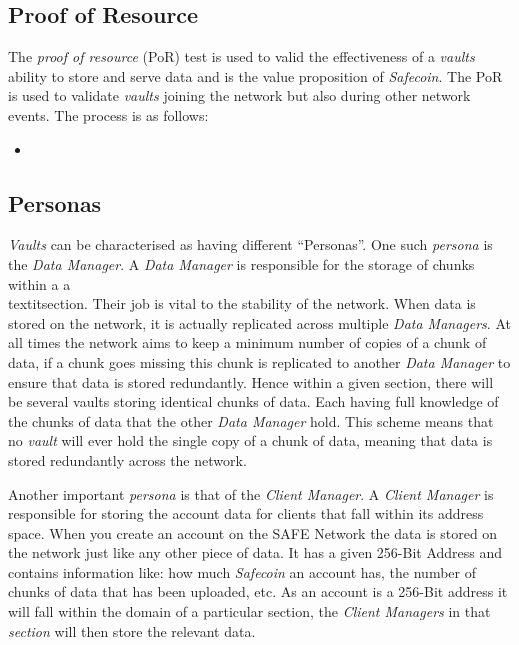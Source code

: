 \subsection{Proof of Resource}
\label{subsec:proof-of-resource}

The \textit{proof of resource} (PoR) test is used to valid the effectiveness of a \textit{vaults} ability to store and serve data and is the value proposition of \textit{Safecoin}. The PoR is used to validate \textit{vaults} joining the network but also during other network events. The process is as follows:

\begin{itemize}
	\item 
\end{itemize}

\subsection{Personas}

\textit{Vaults} can be characterised as having different ``Personas''. One such \textit{persona} is the \textit{Data Manager}. A \textit{Data Manager} is responsible for the storage of chunks within a a\\textit{section}. Their job is vital to the stability of the network. When data is stored on the network, it is actually replicated across multiple \textit{Data Managers}. At all times the network aims to keep a minimum number of copies of a chunk of data, if a chunk goes missing this chunk is replicated to another \textit{Data Manager} to ensure that data is stored redundantly. Hence within a given section, there will be several vaults storing identical chunks of data. Each having full knowledge of the chunks of data that the other \textit{Data Manager} hold. This scheme means that no \textit{vault} will ever hold the single copy of a chunk of data, meaning that data is stored redundantly across the network.

Another important \textit{persona} is that of the \textit{Client Manager}. A \textit{Client Manager} is responsible for storing the account data for clients that fall within its address space. When you create an account on the SAFE Network the data is stored on the network just like any other piece of data. It has a given 256-Bit Address and contains information like: how much \textit{Safecoin} an account has, the number of chunks of data that has been uploaded, etc. As an account is a 256-Bit address it will fall within the domain of a particular section, the \textit{Client Managers} in that \textit{section} will then store the relevant data.

